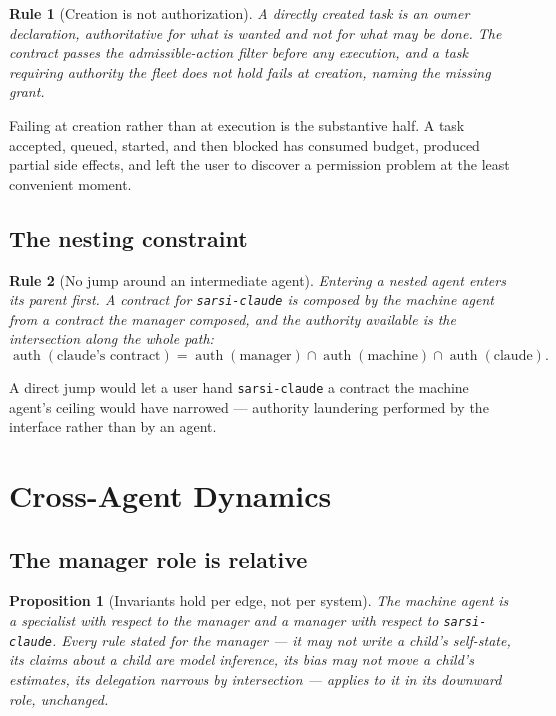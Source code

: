 \documentclass[11pt]{article}
\newtheorem{drule}{Rule}
\newtheorem{proposition}{Proposition}
\newcommand{\code}[1]{\texttt{\small #1}}
\newcommand{\op}[1]{\operatorname{#1}}
\begin{document}
\begin{drule}[Creation is not authorization]
\label{rule:creation}
A directly created task is an owner declaration, authoritative for \emph{what is wanted} and not for \emph{what may be done}. The contract passes the admissible-action filter before any execution, and a task requiring authority the fleet does not hold fails at creation, naming the missing grant.
\end{drule}

Failing at creation rather than at execution is the substantive half. A task accepted, queued, started, and then blocked has consumed budget, produced partial side effects, and left the user to discover a permission problem at the least convenient moment.

\subsection{The nesting constraint}

\begin{drule}[No jump around an intermediate agent]
\label{rule:nojump}
Entering a nested agent enters its parent first. A contract for \code{sarsi-claude} is composed by the machine agent from a contract the manager composed, and the authority available is the intersection along the whole path:
\[
\op{auth}(\text{claude's contract})=\op{auth}(\text{manager})\cap\op{auth}(\text{machine})\cap\op{auth}(\text{claude}).
\]
\end{drule}

A direct jump would let a user hand \code{sarsi-claude} a contract the machine agent's ceiling would have narrowed --- authority laundering performed by the interface rather than by an agent.

\section{Cross-Agent Dynamics}
\label{sec:dynamics}

\subsection{The manager role is relative}
\label{sec:relative}

\begin{proposition}[Invariants hold per edge, not per system]
\label{prop:peredge}
The machine agent is a specialist with respect to the manager and a manager with respect to \code{sarsi-claude}. Every rule stated for the manager --- it may not write a child's self-state, its claims about a child are model inference, its bias may not move a child's estimates, its delegation narrows by intersection --- applies to it in its downward role, unchanged.
\end{proposition}
\end{document}
